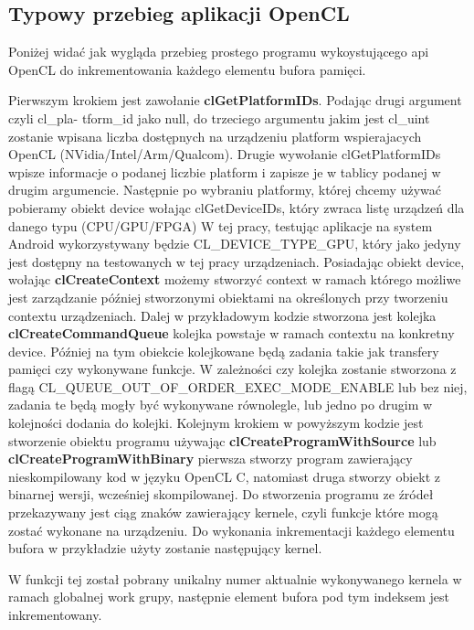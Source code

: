 \subsection{Typowy przebieg aplikacji OpenCL}
Poniżej widać jak wygląda przebieg prostego programu wykoystującego api OpenCL do inkrementowania każdego elementu bufora pamięci.



Pierwszym krokiem jest zawołanie \textbf{clGetPlatformIDs}. Podając drugi argument czyli cl\_pla- tform\_id jako null, do trzeciego argumentu jakim jest cl\_uint\* zostanie wpisana liczba dostępnych na urządzeniu platform wspierajacych OpenCL (NVidia/Intel/Arm/Qualcom).
Drugie wywołanie clGetPlatformIDs wpisze informacje o podanej liczbie platform i zapisze je w tablicy podanej w drugim argumencie.
Następnie po wybraniu platformy, której chcemy używać pobieramy obiekt device wołając clGetDeviceIDs, który zwraca listę urządzeń dla danego typu (CPU/GPU/FPGA)
W tej pracy, testując aplikacje na system Android wykorzystywany będzie CL\_DEVICE\_TYPE\_GPU, który jako jedyny jest dostępny na testowanych w tej pracy urządzeniach.
Posiadając obiekt device, wołając \textbf{clCreateContext} możemy stworzyć context w ramach którego możliwe jest zarządzanie później stworzonymi obiektami na określonych przy tworzeniu contextu urządzeniach.
Dalej w przykładowym kodzie stworzona jest kolejka \textbf{clCreateCommandQueue} kolejka powstaje w ramach contextu na konkretny device. Później na tym obiekcie kolejkowane będą zadania takie jak transfery pamięci czy wykonywane funkcje. W zależności czy kolejka zostanie stworzona z flagą CL\_QUEUE\_OUT\_OF\_ORDER\_EXEC\_MODE\_ENABLE lub bez niej, zadania te będą mogły być wykonywane równolegle, lub jedno po drugim w kolejności dodania do kolejki.
Kolejnym krokiem w powyższym kodzie jest stworzenie obiektu programu używając \textbf{clCreateProgramWithSource} lub \textbf{clCreateProgramWithBinary} pierwsza stworzy program zawierający nieskompilowany kod w języku OpenCL C, natomiast druga stworzy obiekt z binarnej wersji, wcześniej skompilowanej. Do stworzenia programu ze źródeł przekazywany jest ciąg znaków zawierający kernele, czyli funkcje które mogą zostać wykonane na urządzeniu.
Do wykonania inkrementacji każdego elementu bufora w przykładzie użyty zostanie następujący kernel.

W funkcji tej został pobrany unikalny numer aktualnie wykonywanego kernela w ramach globalnej work grupy, następnie element bufora pod tym indeksem jest inkrementowany. 
